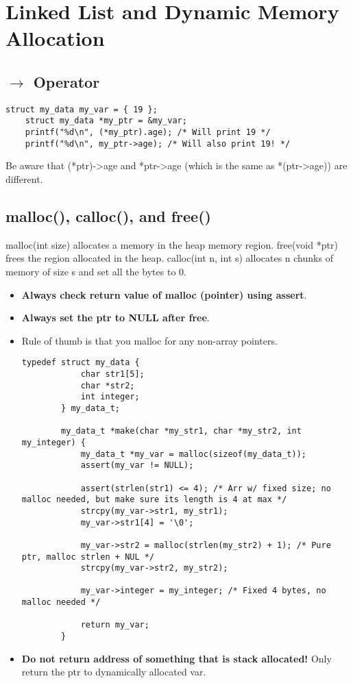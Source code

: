 \documentclass{article}
\begin{document}
\section{Linked List and Dynamic Memory Allocation}

\subsection{$\rightarrow$ Operator}
\begin{lstlisting}[style=CStyle]
    struct my_data my_var = { 19 };
    struct my_data *my_ptr = &my_var;
    printf("%d\n", (*my_ptr).age); /* Will print 19 */
    printf("%d\n", my_ptr->age); /* Will also print 19! */
\end{lstlisting}
Be aware that (*ptr)-\textgreater age and *ptr-\textgreater age (which is the same as *(ptr-\textgreater age)) are different.

\subsection{malloc(), calloc(), and free()}
malloc(int size) allocates a memory in the heap memory region. free(void *ptr) frees the region allocated in the heap.
calloc(int n, int s) allocates n chunks of memory of size s and set all the bytes to 0.
\begin{itemize}
    \item \textbf{Always check return value of malloc (pointer) using assert}.
    \item \textbf{Always set the ptr to NULL after free}.
    \item Rule of thumb is that you malloc for any non-array pointers.
    \begin{lstlisting}[style=CStyle]
        typedef struct my_data {
            char str1[5];
            char *str2;
            int integer;
        } my_data_t;

        my_data_t *make(char *my_str1, char *my_str2, int my_integer) {
            my_data_t *my_var = malloc(sizeof(my_data_t));
            assert(my_var != NULL);

            assert(strlen(str1) <= 4); /* Arr w/ fixed size; no malloc needed, but make sure its length is 4 at max */
            strcpy(my_var->str1, my_str1);
            my_var->str1[4] = '\0';

            my_var->str2 = malloc(strlen(my_str2) + 1); /* Pure ptr, malloc strlen + NUL */
            strcpy(my_var->str2, my_str2);

            my_var->integer = my_integer; /* Fixed 4 bytes, no malloc needed */

            return my_var;
        }
    \end{lstlisting}
    \item \textbf{Do not return address of something that is stack allocated!} Only return the ptr to dynamically allocated var.
\end{itemize}
\end{document}
